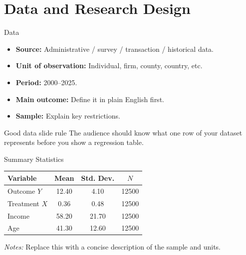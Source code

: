 \documentclass[10pt,aspectratio=169]{beamer}
\begin{document}
\section{Data and Research Design}

\begin{frame}{Data}
\begin{itemize}
  \item \textbf{Source:} Administrative / survey / transaction / historical data.
  \item \textbf{Unit of observation:} Individual, firm, county, country, etc.
  \item \textbf{Period:} 2000--2025.
  \item \textbf{Main outcome:} Define it in plain English first.
  \item \textbf{Sample:} Explain key restrictions.
\end{itemize}

\vspace{0.6em}
\begin{block}{Good data slide rule}
The audience should know what one row of your dataset represents before you show a regression table.
\end{block}
\end{frame}

\begin{frame}{Summary Statistics}
\centering
\small
\begin{threeparttable}
\begin{tabular}{lS[table-format=4.2]S[table-format=4.2]S[table-format=5.0]}
\toprule
Variable & {Mean} & {Std. Dev.} & {$N$} \\
\midrule
Outcome $Y$      & 12.40 & 4.10 & 12500 \\
Treatment $X$    & 0.36  & 0.48 & 12500 \\
Income           & 58.20 & 21.70 & 12500 \\
Age              & 41.30 & 12.60 & 12500 \\
\bottomrule
\end{tabular}
\begin{tablenotes}\footnotesize
\item \textit{Notes:} Replace this with a concise description of the sample and units.
\end{tablenotes}
\end{threeparttable}
\end{frame}
\end{document}
